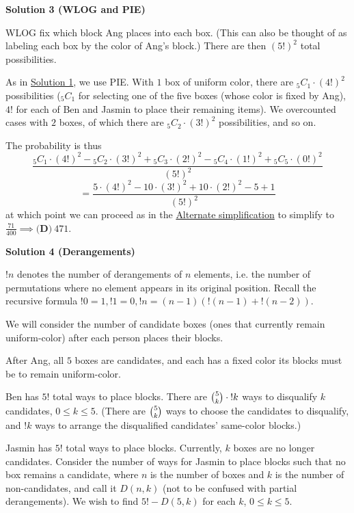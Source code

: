 \begin{enumerate}
 



\textbf{Solution 3 (WLOG and PIE)}

WLOG fix which block Ang places into each box. (This can also be thought of as labeling each box by the color of Ang's block.) There are then $(5!)^2$ total possibilities.

 As in \href{https://artofproblemsolving.com\#Solution\_1\_(Principle\_of\_Inclusion-Exclusion)}{Solution 1}, we use PIE. With $1$ box of uniform color, there are ${}_{5} C _{1} \cdot (4!)^2$ possibilities (${}_{5} C _{1}$ for selecting one of the five boxes (whose color is fixed by Ang), $4!$ for each of Ben and Jasmin to place their remaining items). We overcounted cases with $2$ boxes, of which there are ${}_{5} C _{2} \cdot (3!)^2$ possibilities, and so on.

 The probability is thus
 \[\frac{{}_{5} C _{1} \cdot (4!)^2 - {}_{5} C _{2} \cdot (3!)^2 + {}_{5} C _{3} \cdot (2!)^2 - {}_{5} C _{4} \cdot (1!)^2 + {}_{5} C _{5} \cdot (0!)^2}{(5!)^2}\]
 \[= \frac{5 \cdot (4!)^2 - 10 \cdot (3!)^2 + 10 \cdot (2!)^2 - 5 + 1}{(5!)^2}\]at which point we can proceed as in the \href{https://artofproblemsolving.com\#Alternate\_simplification}{Alternate simplification} to simplify to $\frac{71}{400} \implies \boxed{\textbf{(D)}~471}$.

 



\textbf{Solution 4 (Derangements)}

$!n$ denotes the number of derangements of $n$ elements, i.e. the number of permutations where no element appears in its original position. Recall the recursive formula $!0 = 1, !1 = 0, !n = (n-1)(!(n-1)+{!}(n-2))$.

 
We will consider the number of candidate boxes (ones that currently remain uniform-color) after each person places their blocks.

 After Ang, all $5$ boxes are candidates, and each has a fixed color its blocks must be to remain uniform-color.

 Ben has $5!$ total ways to place blocks. There are $\tbinom{5}{k}\cdot{!}k$ ways to disqualify $k$ candidates, $0 \le k \le 5$. (There are $\tbinom{5}{k}$ ways to choose the candidates to disqualify, and $!k$ ways to arrange the disqualified candidates' same-color blocks.)

 
Jasmin has $5!$ total ways to place blocks. Currently, $k$ boxes are no longer candidates. Consider the number of ways for Jasmin to place blocks such that no box remains a candidate, where $n$ is the number of boxes and $k$ is the number of non-candidates, and call it $D(n,k)$ (not to be confused with partial derangements). We wish to find $5!-D(5,k)$ for each $k$, $0 \le k \le 5$.


\end{enumerate}
